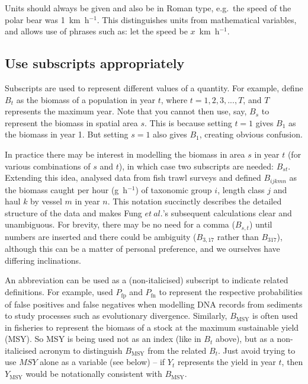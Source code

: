 Units should always be given and also be in Roman type, e.g.~the speed of the polar bear was
1~km~h$^{-1}$. This distinguishes units from mathematical variables, and allows
use of phrases such
as: let the speed be $x$~km~h$^{-1}$.



\subsection*{Use subscripts appropriately}

Subscripts are used to represent different values of a quantity.
For example, define $B_t$ as the biomass of a population in year $t$, where
$t=1, 2, 3, ..., T$, and $T$ represents the maximum year.
Note that you cannot then
use, say, $B_s$ to represent the biomass in spatial area $s$. This is
because setting $t=1$ gives $B_1$ as the biomass in year 1. But
setting $s=1$ also gives $B_1$, creating obvious confusion.

In practice there may be interest in modelling the biomass in
area $s$ in year $t$ (for various combinations of $s$ and $t$),
in which case two subscripts are needed: $B_{st}$.
Extending this idea, \citet{ffrr12} analysed data from fish trawl surveys
and defined
$B_{ijkmn}$ as the biomass caught per hour (g~h$^{-1}$) of
taxonomic group $i$,
length class $j$
and haul $k$ by
vessel $m$ in
year $n$. This notation succinctly describes the detailed structure of the data
and makes Fung $et~al.$'s subsequent calculations clear and unambiguous.
For brevity, there may be no need for a comma ($B_{s,t}$) until numbers are
inserted and there
could be ambiguity ($B_{3,17}$ rather than $B_{317}$),
although this can be a matter of personal preference, and we ourselves have
differing inclinations.

An abbreviation can be used as a (non-italicised) subscript to indicate related
definitions.
For example, \citet{olajos18} used $P_\mathrm{fp}$ and $P_\mathrm{fn}$ to
represent the respective probabilities of false positives and false negatives
when modelling DNA records from sediments to study processes such as
evolutionary divergence.
Similarly, $B_\mathrm{MSY}$ is often
used in fisheries to represent the biomass of a stock at the maximum sustainable
yield (MSY). So MSY is being used not as an index (like in $B_t$ above), but as
a non-italicised acronym to
distinguish $B_\mathrm{MSY}$ from the related $B_t$.
Just avoid trying to use $MSY$ alone as
a variable (see below) -- if $Y_t$ represents the yield in
year $t$, then
$Y_\mathrm{MSY}$  would be notationally consistent with
$B_\mathrm{MSY}$.

